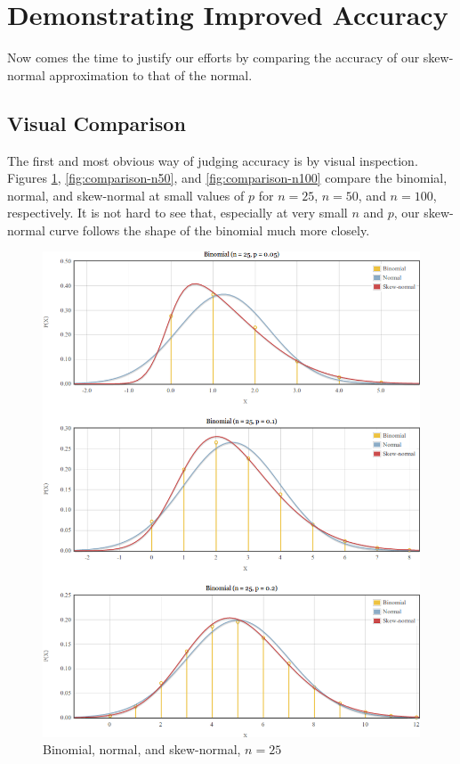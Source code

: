 \documentclass{article}
\begin{document}
\section{Demonstrating Improved Accuracy}
\label{sec:accuracy}

Now comes the time to justify our efforts by comparing the accuracy of our
skew-normal approximation to that of the normal.

\subsection{Visual Comparison}

The first and most obvious way of judging accuracy is by visual inspection.
Figures \ref{fig:comparison-n25}, \ref{fig:comparison-n50}, and
\ref{fig:comparison-n100} compare the binomial, normal, and skew-normal at
small values of $p$ for $n=25$, $n=50$, and $n=100$, respectively. It is not
hard to see that, especially at very small $n$ and $p$, our skew-normal curve
follows the shape of the binomial much more closely.

\begin{figure}
  \centering
  \includegraphics[width=\textwidth]{../images/comparison-n25.png}
  \caption{Binomial, normal, and skew-normal, $n=25$}
  \label{fig:comparison-n25}
\end{figure}
\end{document}
